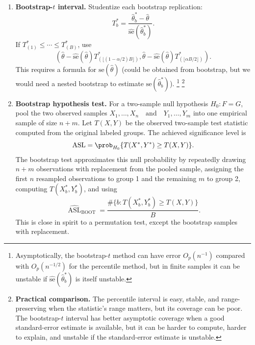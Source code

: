 \begin{enumerate}
    \item \textbf{Bootstrap-$t$ interval.}
    Studentize each bootstrap replication:
    \[
        T_b^*
        =
        \frac{\hat\theta_b^*-\hat\theta}
             {\widehat{\mathrm{se}}(\hat\theta_b^*)}.
    \]
    If $T^*_{(1)}\le\cdots\le T^*_{(B)}$, use
    \[
        \left(
            \hat\theta-\widehat{\mathrm{se}}(\hat\theta)T^*_{(\lfloor (1-\alpha/2)B\rfloor)},
            \hat\theta-\widehat{\mathrm{se}}(\hat\theta)T^*_{(\lfloor \alpha B/2\rfloor)}
        \right).
    \]
    This requires a formula for $\text{se}(\hat\theta)$ (could be obtained from bootstrap, but we would need a nested bootstrap to estimate $\text{se}(\hat\theta_b^*)$). \footnote{Asymptotically, the bootstrap-$t$ method can have error $O_p(n^{-1})$ compared with $O_p(n^{-1/2})$ for the percentile method, but in finite samples it can be unstable if $\widehat{\mathrm{se}}(\hat\theta_b^*)$ is itself unstable.}
    \footnote{\textbf{Practical comparison.} The percentile interval is easy, stable, and range-preserving when the statistic's range matters, but its coverage can be poor. The bootstrap-$t$ interval has better asymptotic coverage when a good standard-error estimate is available, but it can be harder to compute, harder to explain, and unstable if the standard-error estimate is unstable.}

    \item \textbf{Bootstrap hypothesis test.}
    For a two-sample null hypothesis $H_0:F=G$, pool the two observed samples $X_1,\ldots,X_n \quad\text{and}\quad Y_1,\ldots,Y_m$ into one empirical sample of size $n+m$. Let $T(X,Y)$ be the observed two-sample test statistic computed from the original labeled groups. The achieved significance level is
    \[
        \operatorname{ASL}
        =
        \prob_{H_0}\{T(X^*,Y^*)\ge T(X,Y)\}.
    \]
    The bootstrap test approximates this null probability by repeatedly drawing $n+m$ observations with replacement from the pooled sample, assigning the first $n$ resampled observations to group 1 and the remaining $m$ to group 2, computing $T(X_b^*,Y_b^*)$, and using
    \[
        \widehat{\operatorname{ASL}}_{\mathrm{BOOT}}
        =
        \frac{\#\{b:T(X_b^*,Y_b^*)\ge T(X,Y)\}}{B}.
    \]
    This is close in spirit to a permutation test, except the bootstrap samples with replacement.
\end{enumerate}


